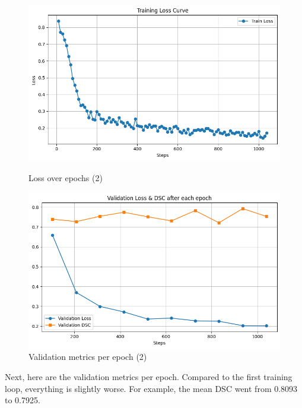 \documentclass[11pt,a4paper]{article}
\begin{document}
\begin{figure}[H]
    \centering
    \begin{minipage}[t]{0.48\textwidth}
        \centering
        \includegraphics[width=\linewidth]{./img/training_loss_2.png}
        \caption{Loss over epochs (2)}
        \label{fig:training_loss_2}
    \end{minipage}
    \begin{minipage}[t]{0.48\textwidth}
        \centering
        \includegraphics[width=\linewidth]{./img/validation_metric_per_epoch_2.png}
        \caption{Validation metrics per epoch (2)}
        \label{fig:validation_metric_per_epoch_2}
    \end{minipage}
\end{figure}

Next, here are the validation metrics per epoch. Compared to the first training loop, everything is slightly worse. For example, the mean DSC went from 0.8093 to 0.7925.
\end{document}
